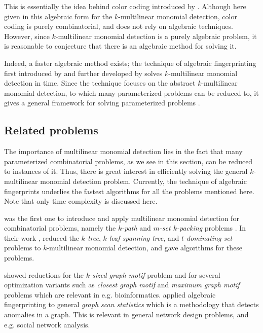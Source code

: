 This is essentially the idea behind color coding 
introduced by \textcite{Alon95}. 
Although here given in this algebraic form for 
the $k$-multilinear monomial detection, 
color coding is purely combinatorial, 
and does not rely on algebraic techniques. 
However, since $k$-multilinear monomial detection is a 
purely algebraic problem, it is reasonable to 
conjecture that there is an algebraic method for solving it.

Indeed, a faster algebraic method exists; the technique of algebraic fingerprinting 
first introduced by \textcite{Koutis08} and 
further developed by \textcite{Williams09} 
solves $k$-multilinear monomial detection in  time. 
Since the technique focuses on the abstract $k$-multilinear monomial detection, 
to which many parameterized problems can be reduced to, 
it gives a general framework for 
solving parameterized problems \cite{KouWil15}.

\subsection{Related problems}
\label{sect:related_problems}

The importance of multilinear monomial detection lies in the fact 
that many parameterized combinatorial problems, as we see in this section, 
can be reduced to instances of it. 
Thus, there is great interest in efficiently solving the 
general $k$-multilinear monomial detection problem. 
Currently, the technique of algebraic fingerprints underlies the fastest algorithms 
for all the problems mentioned here. 
Note that only time complexity is discussed here. 

\citeauthor{Koutis08} was the first one to introduce and apply multilinear monomial 
detection for combinatorial problems, namely the \emph{$k$-path} and \emph{$m$-set $k$-packing} problems 
\cite{Koutis08}. 
In their work \cite{KouWil09}, \citeauthor{KouWil09} reduced 
the \emph{$k$-tree}, \emph{$k$-leaf spanning tree}, and \emph{$t$-dominating set} problems 
to $k$-multilinear monomial detection, and 
gave  algorithms for these problems.  

\textcite{Björklund16} showed reductions for the 
\emph{$k$-sized graph motif} problem and for
several optimization variants such as \emph{closest graph motif} 
and \emph{maximum graph motif} problems which are relevant in e.g. bioinformatics. 
\textcite{Cadena17} 
applied algebraic fingerprinting to general \emph{graph scan statistics} 
which is a methodology that detects anomalies in a graph. This is relevant in 
general network design problems, and e.g. social network analysis.

